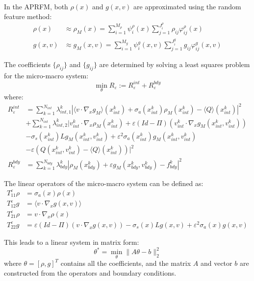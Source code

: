 \documentclass[11pt]{article}
\begin{document}
In the APRFM, both $\rho(x)$ and $g(x,v)$ are approximated using the random feature method:
\begin{align}
\rho(x) &\approx \rho_M(x) = \sum_{i=1}^{M_\rho} \psi_i^\rho(x) \sum_{j=1}^{J_i^\rho} \rho_{ij} \varphi_{ij}^\rho(x)\\
g(x,v) &\approx g_M(x,v) = \sum_{i=1}^{M_g} \psi_i^g(x,v) \sum_{j=1}^{J_i^g} g_{ij} \varphi_{ij}^g(x,v)
\end{align}

The coefficients $\{\rho_{ij}\}$ and $\{g_{ij}\}$ are determined by solving a least squares problem for the micro-macro system:
\begin{equation}
\min_{\theta} R_\varepsilon := R_\varepsilon^{int} + R_\varepsilon^{bdy}
\end{equation}
where:
\begin{align}
R_\varepsilon^{int} &= \sum_{k=1}^{N_{int}} \lambda_{int,1}^k |\langle v \cdot \nabla_x g_M \rangle(x_{int}^k) + \sigma_a(x_{int}^k) \rho_M(x_{int}^k) - \langle Q \rangle(x_{int}^k)|^2\\
&+ \sum_{k=1}^{N_{int}} \lambda_{int,2}^k |v_{int}^k \cdot \nabla_x \rho_M(x_{int}^k) + \varepsilon (Id - \Pi)(v_{int}^k \cdot \nabla_x g_M(x_{int}^k, v_{int}^k))\\
&- \sigma_s(x_{int}^k) L g_M(x_{int}^k, v_{int}^k) + \varepsilon^2 \sigma_a(x_{int}^k) g_M(x_{int}^k, v_{int}^k)\\
&- \varepsilon(Q(x_{int}^k, v_{int}^k) - \langle Q \rangle(x_{int}^k))|^2\\
R_\varepsilon^{bdy} &= \sum_{k=1}^{N_{bdy}} \lambda_{bdy}^k|\rho_M(x_{bdy}^k) + \varepsilon g_M(x_{bdy}^k, v_{bdy}^k) - f_{bdy}^k|^2
\end{align}

The linear operators of the micro-macro system can be defined as:
\begin{align}
T_{11}^\varepsilon \rho &= \sigma_a(x) \rho(x)\\
T_{12}^\varepsilon g &= \langle v \cdot \nabla_x g(x,v) \rangle\\
T_{21}^\varepsilon \rho &= v \cdot \nabla_x \rho(x)\\
T_{22}^\varepsilon g &= \varepsilon (Id - \Pi)(v \cdot \nabla_x g(x,v)) - \sigma_s(x) L g(x,v) + \varepsilon^2 \sigma_a(x) g(x,v)
\end{align}

This leads to a linear system in matrix form:
\begin{equation}
\theta^* = \min_{\theta} \|A\theta - b\|_2^2
\end{equation}
where $\theta = [\rho, g]^T$ contains all the coefficients, and the matrix $A$ and vector $b$ are constructed from the operators and boundary conditions.
\end{document}

